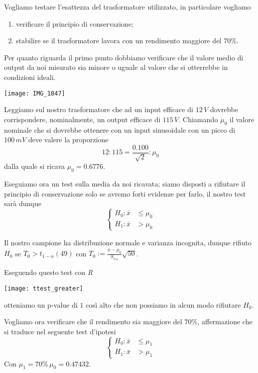 \documentclass[a4paper]{article}
\begin{document}
	Vogliamo testare l'esattezza del trasformatore utilizzato, in particolare vogliamo
		\begin{enumerate} 
			\item verificare il principio di conservazione;
			\item stabilire se il trasformatore lavora con un rendimento maggiore del $70\%$.
		\end{enumerate}
	
	Per quanto riguarda il primo punto dobbiamo verificare che il valore medio di output da noi misurato sia minore o uguale al valore che si otterrebbe in condizioni ideali.
	
	\begin{center}
		\texttt{[image: IMG\_1847]} 
	\end{center}
	 Leggiamo sul nostro trasformatore che ad un input efficace di $12\,V$ dovrebbe corrispondere, nominalmente, un output efficace di $115\,V$. Chiamando $\mu_0$ il valore nominale che si dovrebbe ottenere con un input sinusoidale con un picco di $100\,mV$ deve valere la proporzione \[12:115=\frac{0.100}{\sqrt{2}}:\mu_0\] dalla quale si ricava $\mu_0=0.6776$. 
	
	Eseguiamo ora un test sulla media da noi ricavata; siamo disposti a rifiutare il principio di conservazione solo se avremo forti evidenze per farlo, il nostro test sarà dunque \[\begin{cases}
	H_0: \bar{x}&\le\mu_0 \\	H_1: \bar{x}&>\mu_0
	\end{cases}
	\]
	
	Il nostro campione ha distribuzione normale e varianza incognita, dunque rifiuto $H_0$ se $T_0 > t_{1-\alpha}(49)$ con $T_0:= \frac{\bar{x}-\mu_0}{S_{x_{50}}}\sqrt{50} $.
	
	 Eseguendo questo test con \emph{R}
	\begin{center}
		
		\texttt{[image: ttest\_greater]} 
		
	\end{center}
	 otteniamo un p-value di $1$ così alto che non possiamo in alcun modo rifiutare $H_0$.
	 
	 Vogliamo ora verificare che il rendimento sia maggiore del $70\%$, affermazione che si traduce nel seguente test d'ipotesi 
	\[\begin{cases}
	H_0: \bar{x}&\le\mu_1 \\	H_1: \bar{x}&>\mu_1
	\end{cases}
	\]
	Con $\mu_1=70\%\,\mu_0=0.47432$.
	
\end{document}
